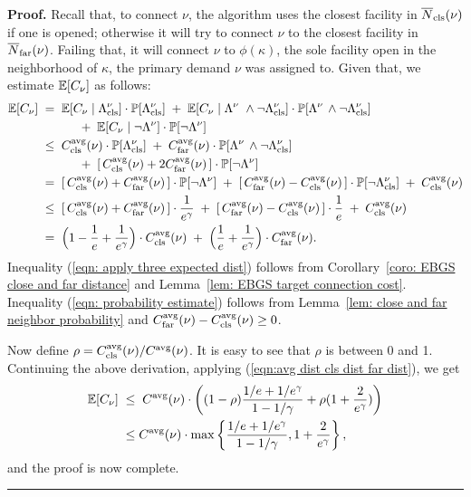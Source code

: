 \documentclass[oneside,final]{ucr}
\newenvironment{proof}[1][Proof]{\textbf{#1.} }{\ \rule{0.5em}{0.5em}}
\begin{document}
\begin{proof}
  Recall that, to connect $\nu$, the algorithm uses the closest facility in
  ${\overline{N}}_{{\mbox{\scriptsize\rm cls}}}(\nu)$ if one is opened; otherwise it will try to connect $\nu$
  to the closest facility in ${\overline{N}}_{{\mbox{\scriptsize\rm far}}}(\nu)$. Failing that, it will
  connect $\nu$ to $\phi(\kappa)$, the sole facility open in the
  neighborhood of $\kappa$, the primary demand $\nu$ was assigned
  to. Given that, we estimate $\mathbb{E}[C_\nu]$ as follows:
%
  \begin{align}
    \mathbb{E}[C_{\nu}] 
		\;&= \;\mathbb{E}[C_{\nu}\mid \Lambda^\nu_{{\mbox{\scriptsize\rm cls}}}] \cdot \mathbb{P}[\Lambda^\nu_{{\mbox{\scriptsize\rm cls}}}]	
				\;+\; \mathbb{E}[C_{\nu}\mid \Lambda^\nu\ \wedge\neg \Lambda^\nu_{{\mbox{\scriptsize\rm cls}}}] 
				\cdot \mathbb{P}[\Lambda^\nu\, \wedge\neg \Lambda^\nu_{{\mbox{\scriptsize\rm cls}}}]	
				\notag
		\\
		& \quad\quad\quad
				+ \; \mathbb{E}[C_{\nu}\mid \neg \Lambda^\nu] \cdot \mathbb{P}[\neg \Lambda^\nu]
				\notag
		\\
		&\leq \; C_{{\mbox{\scriptsize\rm cls}}}^{{\mbox{\scriptsize\rm avg}}}(\nu) \cdot \mathbb{P}[\Lambda^\nu_{{\mbox{\scriptsize\rm cls}}}]
			\;+\; C_{{\mbox{\scriptsize\rm far}}}^{{\mbox{\scriptsize\rm avg}}}(\nu)	
				\cdot \mathbb{P}[\Lambda^\nu\, \wedge\neg \Lambda^\nu_{{\mbox{\scriptsize\rm cls}}}]
                      \label{eqn: apply three expected dist}
						\\
                        &\quad\quad\quad
			+\; [\,C_{{\mbox{\scriptsize\rm cls}}}^{{\mbox{\scriptsize\rm avg}}}(\nu) + 2C_{{\mbox{\scriptsize\rm far}}}^{{\mbox{\scriptsize\rm avg}}}(\nu)\,] \cdot \mathbb{P}[\neg\Lambda^\nu]
		\notag
		\\
                &=\; [\,C_{{\mbox{\scriptsize\rm cls}}}^{{\mbox{\scriptsize\rm avg}}}(\nu) + C_{{\mbox{\scriptsize\rm far}}}^{{\mbox{\scriptsize\rm avg}}}(\nu)\,]\cdot \mathbb{P}[\neg\Lambda^\nu] 
						\;+\; 
							[\,C_{{\mbox{\scriptsize\rm far}}}^{{\mbox{\scriptsize\rm avg}}}(\nu)   -C_{{\mbox{\scriptsize\rm cls}}}^{{\mbox{\scriptsize\rm avg}}}(\nu)\,]
                                \cdot \mathbb{P}[\neg\Lambda^\nu_{{\mbox{\scriptsize\rm cls}}}]
                              \;+\;  C_{{\mbox{\scriptsize\rm cls}}}^{{\mbox{\scriptsize\rm avg}}}(\nu)
                                                        \notag
		\\
             &\leq\; [\,C_{{\mbox{\scriptsize\rm cls}}}^{{\mbox{\scriptsize\rm avg}}}(\nu) + C_{{\mbox{\scriptsize\rm far}}}^{{\mbox{\scriptsize\rm avg}}}(\nu)\,] \cdot \frac{1}{e^\gamma}
             \;+\; [\,C_{{\mbox{\scriptsize\rm far}}}^{{\mbox{\scriptsize\rm avg}}}(\nu) - C_{{\mbox{\scriptsize\rm cls}}}^{{\mbox{\scriptsize\rm avg}}}(\nu)\,] \cdot \frac{1}{e}
             \;+\; C_{{\mbox{\scriptsize\rm cls}}}^{{\mbox{\scriptsize\rm avg}}}(\nu)
             \label{eqn: probability estimate}
             \\
             \notag
             &=\; \Big(1 - \frac{1}{e} + \frac{1}{e^\gamma}\Big)\cdot C_{{\mbox{\scriptsize\rm cls}}}^{{\mbox{\scriptsize\rm avg}}}(\nu)
 				\;+\; \Big(\frac{1}{e} + \frac{1}{e^\gamma}\Big)\cdot C_{{\mbox{\scriptsize\rm far}}}^{{\mbox{\scriptsize\rm avg}}}(\nu).
\end{align}
%
Inequality (\ref{eqn: apply three expected dist}) follows from
Corollary~\ref{coro: EBGS close and far distance} and 
Lemma~\ref{lem: EBGS target connection cost}. 
Inequality (\ref{eqn: probability estimate}) follows from 
Lemma~\ref{lem: close and far neighbor probability} and
$C_{{\mbox{\scriptsize\rm far}}}^{{\mbox{\scriptsize\rm avg}}}(\nu) - C_{{\mbox{\scriptsize\rm cls}}}^{{\mbox{\scriptsize\rm avg}}}(\nu)\ge 0$.

Now define $\rho =C_{{\mbox{\scriptsize\rm cls}}}^{{\mbox{\scriptsize\rm avg}}}(\nu)/C^{{\mbox{\scriptsize\rm avg}}}(\nu)$. It is easy to
see that $\rho$ is between 0 and 1. Continuing the above
derivation, applying (\ref{eqn:avg dist cls dist far dist}), we get
%
\begin{align*}
\mathbb{E}[C_{\nu}]
             \;&\le\; C^{{\mbox{\scriptsize\rm avg}}}(\nu) 
			\cdot\left((1-\rho)\frac{1/e+1/e^\gamma}{1-1/\gamma} 
				+ \rho (1 + \frac{2}{e^\gamma})\right)
			\\
             &\leq C^{{\mbox{\scriptsize\rm avg}}}(\nu) 
				\cdot \max\left\{\frac{1/e+1/e^\gamma}{1-1/\gamma}, 1 + \frac{2}{e^\gamma}\right\},
\end{align*}
%
and the proof is now complete.
\end{proof}
\end{document}
